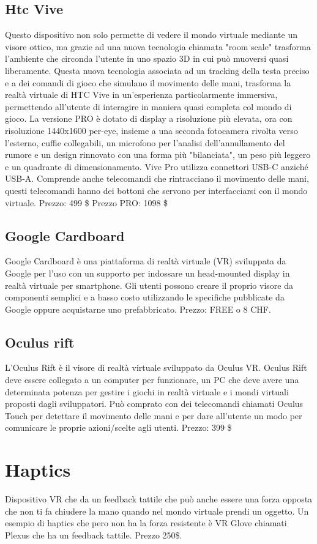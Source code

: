 \documentclass[8pt]{extarticle}
\begin{document}
\begin{multicols}{3}
\subsection{Htc Vive}
Questo dispositivo non solo permette di vedere il mondo virtuale mediante un visore ottico, ma grazie ad una nuova tecnologia chiamata "room scale" trasforma l'ambiente che circonda l'utente in uno spazio 3D in cui può muoversi quasi liberamente. Questa nuova tecnologia associata ad un tracking della testa preciso e a dei comandi di gioco che simulano il movimento delle mani, trasforma la realtà virtuale di HTC Vive in un'esperienza particolarmente immersiva, permettendo all'utente di interagire in maniera quasi completa col mondo di gioco.
La versione PRO è dotato di display a risoluzione più elevata, ora con risoluzione 1440x1600 per-eye, insieme a una seconda fotocamera rivolta verso l'esterno, cuffie collegabili, un microfono per l'analisi dell'annullamento del rumore e un design rinnovato con una forma più "bilanciata", un peso più leggero e un quadrante di dimensionamento. Vive Pro utilizza connettori USB-C anziché USB-A. Comprende anche telecomandi che rintracciano il movimento delle mani, questi telecomandi hanno dei bottoni che servono per interfacciarsi con il mondo virtuale.
Prezzo: 499 \$
Prezzo PRO: 1098 \$
\subsection{Google Cardboard}
Google Cardboard è una piattaforma di realtà virtuale (VR) sviluppata da Google per l'uso con un supporto per indossare un head-mounted display in realtà virtuale per smartphone.  Gli utenti possono creare il proprio visore da componenti semplici e a basso costo utilizzando le specifiche pubblicate da Google oppure acquistarne uno prefabbricato. 
Prezzo: FREE o 8 CHF.
\subsection{Oculus rift}
L'Oculus Rift è il visore di realtà virtuale sviluppato da Oculus VR. Oculus Rift deve essere collegato a un computer per funzionare, un PC che deve avere una determinata potenza per gestire i giochi in realtà virtuale e i mondi virtuali proposti dagli sviluppatori. 
Può comprato con dei telecomandi chiamati Oculus Touch per detettare il movimento delle mani e per dare all’utente un modo per comunicare le proprie azioni/scelte agli utenti.
Prezzo: 399 \$
\section{Haptics}
Dispositivo VR che da un feedback tattile che può anche essere una forza opposta che non ti fa chiudere la mano quando nel mondo virtuale prendi un oggetto.
Un esempio di haptics che pero non ha la forza resistente è VR Glove chiamati Plexus che ha un feedback tattile. Prezzo 250\$.

\end{multicols}
\end{document}
